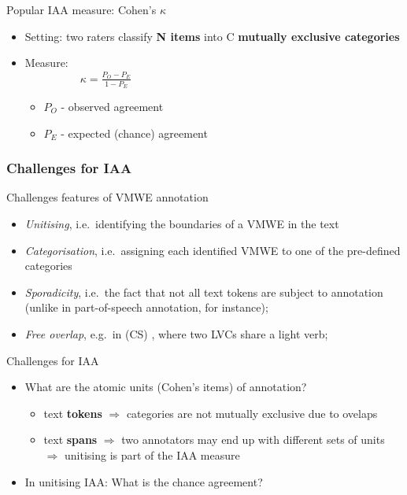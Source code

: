 \documentclass[xcolor=dvipsnames]{beamer}
\begin{document}
\begin{frame}
\begin{frame}
\begin{block}{Popular IAA measure: Cohen's $\kappa$}
\begin{itemize}
\item Setting: two raters classify \textbf{N items} into C \textbf{mutually exclusive categories}
\item Measure: \\
~~~~~~~~~~$\kappa = \frac{P_O - P_E}{1-P_E}$
   \begin{itemize}
   \item $P_O$ - observed agreement
   \item $P_E$ - expected (chance) agreement
   \end{itemize}
\end{itemize}
\end{block}

\end{frame}

\begin{frame}[label={iaa}]
  \vspace*{-5pt}
  \frametitle{Challenges for IAA}

\begin{scriptsize}

\begin{block}{Challenges features of VMWE annotation}
\begin{itemize}
\item \emph{Unitising}, i.e.\ identifying the boundaries of a VMWE in the text
\item \emph{Categorisation}, i.e.\ assigning each identified VMWE to one of the pre-defined categories
\item \emph{Sporadicity}, i.e.\ the fact that not all text tokens are subject to annotation (unlike in part-of-speech annotation, for instance);
\item \emph{Free overlap}, e.g.\ in (CS) , where two LVCs share a light verb;
\end{itemize}
\end{block}

\begin{block}{Challenges for IAA}
\begin{itemize}
\item What are the atomic units (Cohen's items) of annotation?
   \begin{itemize}
   \item text \textbf{tokens} $\Rightarrow$ categories are not mutually exclusive due to ovelaps
   \item text \textbf{spans} $\Rightarrow$ two annotators may end up with different sets of units $\Rightarrow$ unitising is part of the IAA measure
   \end{itemize}
\item In unitising IAA: What is the chance agreement?
\end{itemize}
\end{block}


\end{scriptsize}
\end{frame}
\end{frame}
\end{document}
